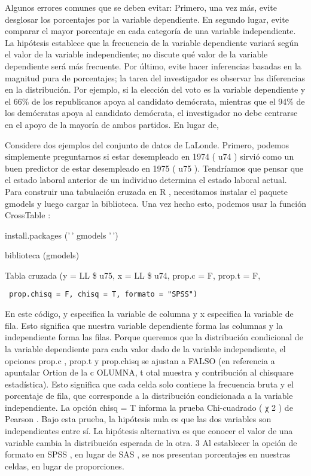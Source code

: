 \documentclass[
]{book}
\begin{document}
Algunos errores comunes que se deben evitar: Primero, una vez más, evite desglosar los porcentajes por la variable dependiente. En segundo lugar, evite comparar el mayor porcentaje en cada categoría de una variable independiente. La hipótesis establece que la frecuencia de la variable dependiente variará según el valor de la variable independiente; no discute qué valor de la variable dependiente será más frecuente. Por último, evite hacer inferencias basadas en la magnitud pura de porcentajes; la tarea del investigador es observar las diferencias en la distribución. Por ejemplo, si la elección del voto es la variable dependiente y el 66\% de los republicanos apoya al candidato demócrata, mientras que el 94\% de los demócratas apoya al candidato demócrata, el investigador no debe centrarse en el apoyo de la mayoría de ambos partidos. En lugar de,

Considere dos ejemplos del conjunto de datos de LaLonde. Primero, podemos simplemente preguntarnos si estar desempleado en 1974 ( u74 ) sirvió como un buen predictor de estar desempleado en 1975 ( u75 ). Tendríamos que pensar que el estado laboral anterior de un individuo determina el estado laboral actual. Para construir una tabulación cruzada en R , necesitamos instalar el paquete gmodels y luego cargar la biblioteca. Una vez hecho esto, podemos usar la función CrossTable :

install.packages ('\,' gmodels '\,')

biblioteca (gmodels)

Tabla cruzada (y = LL \$ u75, x = LL \$ u74, prop.c = F, prop.t = F,

\begin{verbatim}
 prop.chisq = F, chisq = T, formato = "SPSS")
\end{verbatim}

En este código, y especifica la variable de columna y x especifica la variable de fila. Esto significa que nuestra variable dependiente forma las columnas y la independiente forma las filas. Porque queremos que la distribución condicional de la variable dependiente para cada valor dado de la variable independiente, el opciones prop.c , prop.t y prop.chisq se ajustan a FALSO (en referencia a apuntalar Ortion de la c OLUMNA, t otal muestra y contribución al chisquare estadística). Esto significa que cada celda solo contiene la frecuencia bruta y el porcentaje de fila, que corresponde a la distribución condicionada a la variable independiente. La opción chisq = T informa la prueba Chi-cuadrado ( χ 2 ) de Pearson . Bajo esta prueba, la hipótesis nula es que las dos variables son independientes entre sí. La hipótesis alternativa es que conocer el valor de una variable cambia la distribución esperada de la otra. 3 Al establecer la opción de formato en SPSS , en lugar de SAS , se nos presentan porcentajes en nuestras celdas, en lugar de proporciones.
\end{document}
